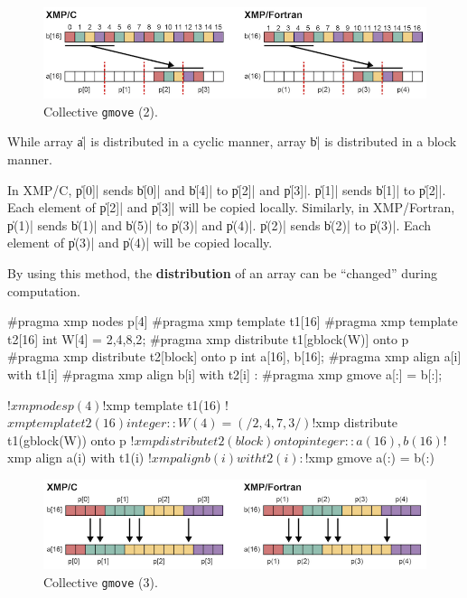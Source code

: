 \begin{figure}
  \centering
  \includegraphics[width=\textwidth]{figs/gmove_cyclic.png}
  \caption{Collective {\tt gmove} (2).}
\end{figure}

While array \|a| is distributed in a cyclic manner, array \|b| is
distributed in a block manner.

In XMP/C, \|p[0]| sends \|b[0]| and \|b[4]| to \|p[2]| and
\|p[3]|. \|p[1]| sends \|b[1]| to \|p[2]|. Each element of \|p[2]| and
\|p[3]| will be copied locally. Similarly, in XMP/Fortran, \|p(1)| sends
\|b(1)| and \|b(5)| to \|p(3)| and \|p(4)|. \|p(2)| sends \|b(2)| to
\|p(3)|. Each element of \|p(3)| and \|p(4)| will be copied locally.


By using this method, the {\bf distribution} of an array can be ``changed''
during computation.

\begin{XCexample}
#pragma xmp nodes p[4]
#pragma xmp template t1[16]
#pragma xmp template t2[16]
int W[4] = {2,4,8,2};
#pragma xmp distribute t1[gblock(W)] onto p
#pragma xmp distribute t2[block] onto p
int a[16], b[16];
#pragma xmp align a[i] with t1[i]
#pragma xmp align b[i] with t2[i]
     :
#pragma xmp gmove
  a[:] = b[:];
\end{XCexample}

\begin{XFexample}
!$xmp nodes p(4)
!$xmp template t1(16)
!$xmp template t2(16)
integer :: W(4) = (/2,4,7,3/)
!$xmp distribute t1(gblock(W)) onto p
!$xmp distribute t2(block) onto p
integer :: a(16), b(16)
!$xmp align a(i) with t1(i)
!$xmp align b(i) with t2(i)
     :
!$xmp gmove
  a(:) = b(:)
\end{XFexample}

\begin{figure}
  \centering
  \includegraphics[width=\textwidth]{figs/gmove_change.png}
  \caption{Collective {\tt gmove} (3).}
\end{figure}

